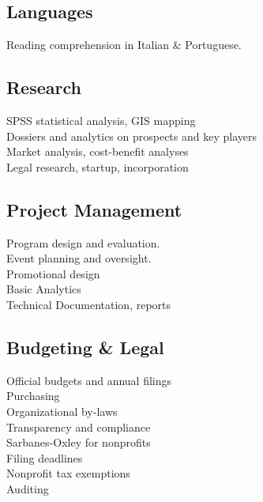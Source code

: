 \documentclass[]{deedy-resume-openfont}
\begin{document}
\hfill
\begin{minipage}[t]{.45\textwidth}
    \subsection{Languages}
        \textbullet{} 
		\textbullet{} Reading comprehension in Italian \& Portuguese.\\
    \sectionsep
	\subsection{Research}
    	\textbullet{} SPSS statistical analysis, GIS mapping \\
    	\textbullet{} Dossiers and analytics on prospects and key players \\
        \textbullet{} Market analysis, cost-benefit analyses \\
        \textbullet{} Legal research, startup, incorporation\\
    \sectionsep
     \subsection{Project Management}
        \textbullet{} Program design and evaluation.\\
		\textbullet{} Event planning and oversight.\\
        \textbullet{} Promotional design\\
        \textbullet{} Basic Analytics \\
        \textbullet{} Technical Documentation, reports\\
    \sectionsep
    \subsection{Budgeting \& Legal}
        \textbullet{} Official budgets and annual filings\\
        \textbullet{} Purchasing\\
		\textbullet{} Organizational by-laws\\
        \textbullet{} Transparency and compliance\\
        \textbullet{} Sarbanes-Oxley for nonprofits\\
		\textbullet{} Filing deadlines\\
        \textbullet{} Nonprofit tax exemptions\\
  	    \textbullet{} Auditing
    \sectionsep
\end{minipage}
\sectionsep
\sectionsep
\end{document}
